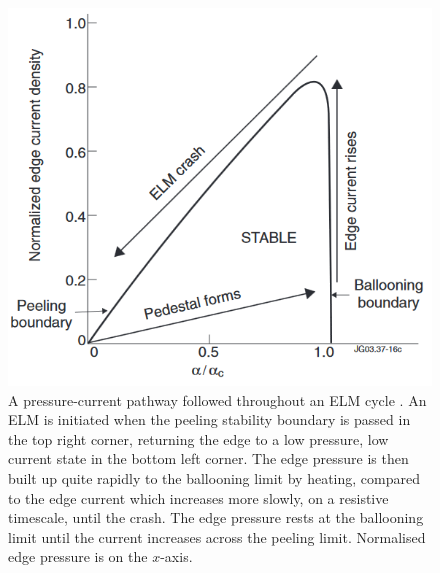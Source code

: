 \documentclass[11pt, twocolumn]{article}  %
\begin{document}
\begin{figure}
\includegraphics[scale=0.5]{Figures/ELMcrash.PNG}
\centering
\caption{A pressure-current pathway followed throughout an ELM cycle \cite{Perez2004}. An ELM is initiated when the peeling stability boundary is passed in the top right corner, returning the edge to a low pressure, low current state in the bottom left corner. The edge pressure is then built up quite rapidly to the ballooning limit by heating, compared to the edge current which increases more slowly, on a resistive timescale, until the crash. The edge pressure rests at the ballooning limit until the current increases across the peeling limit. Normalised edge pressure is on the $x$-axis.}\label{fig:PBcrash}
\end{figure}
\end{document}
